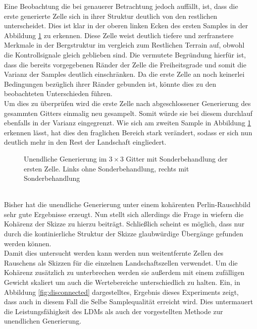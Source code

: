 Eine Beobachtung die bei genauerer Betrachtung jedoch auffällt, ist, dass die erste generierte Zelle sich in ihrer Struktur deutlich von den restlichen unterscheidet. Dies ist klar in der oberen linken Ecken des ersten Samples in der Abbildung \ref{fig:1st_regen} zu erkennen. Diese Zelle weist deutlich tiefere und zerfranstere Merkmale in der Bergstruktur im vergleich zum Restlichen Terrain auf, obwohl die Kontrollsignale gleich geblieben sind. Die vermutete Begründung hierfür ist, dass die bereits vorgegebenen Ränder der Zelle die Freiheitsgrade und somit die Varianz der Samples deutlich einschränken. Da die erste Zelle an noch keinerlei Bedingungen bezüglich ihrer Ränder gebunden ist, könnte dies zu den beobachteten Unterschieden führen. \\ 
Um dies zu überprüfen wird die erste Zelle nach abgeschlossener Generierung des gesammten Gitters einmalig neu gesampelt. Somit würde sie bei diesem durchlauf ebenfalls in der Varianz eingegrenzt. Wie sich am zweiten Sample in Abbildung \ref{fig:1st_regen} erkennen lässt, hat dies den fraglichen Bereich stark verändert, sodass er sich nun deutlich mehr in den Rest der Landschaft eingliedert. 
\begin{figure}[htbp]
    \centering
    \caption{Unendliche Generierung im $3\times3$ Gitter mit Sonderbehandlung der ersten Zelle. Links ohne Sonderbehandlung, rechts mit Sonderbehandlung}
    \label{fig:1st_regen}
\end{figure} \\
Bisher hat die unendliche Generierung unter einem kohärenten Perlin-Rauschbild sehr gute Ergebnisse erzeugt. Nun stellt sich allerdings die Frage in wiefern die Kohärenz der Skizze zu hierzu beiträgt. Schließlich scheint es möglich, dass nur durch die kontinierliche Struktur der Skizze glaubwürdige Übergänge gefunden werden können. \\
Damit dies untersucht werden kann werden nun weitentfernte Zellen des Rauschens als Skizzen für die einzelnen Landschaftszellen verwendet. Um die Kohärenz zusätzlich zu unterbrechen werden sie außerdem mit einem zufälligen Gewicht skaliert um auch die Wertebereiche unterschiedlich zu halten. Ein, in Abbildung \ref{fig:disconnected} dargestelltes, Ergebnis dieses Experiments zeigt, dass auch in diesem Fall die Selbe Samplequalität erreicht wird. Dies untermauert die Leistungsfähigkeit des \ac{LDM}s als auch der vorgestellten Methode zur unendlichen Generierung.  
